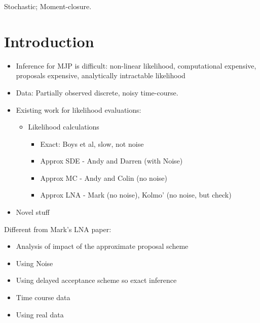\documentclass[useAMS,usenatbib,referee]{example/biom}
\begin{document}
%
%

\begin{keywords}
Stochastic; Moment-closure.
\end{keywords}

\maketitle

\section{Introduction}
\label{s:intro}

\begin{itemize}
\item Inference for MJP is difficult: non-linear likelihood, computational
  expensive, proposals expensive, analytically intractable likelihood
\item Data: Partially observed discrete, noisy time-course.
\item Existing work for likelihood evaluations: 
\begin{itemize}
\item Likelihood calculations
\begin{itemize}
\item Exact: Boys et al, slow, not noise
\item Approx SDE - Andy and Darren (with Noise)
\item Approx MC - Andy and Colin (no noise)
\item Approx LNA - Mark (no noise), Kolmo' (no noise, but check)
\end{itemize}
\end{itemize}
\item Novel stuff
\end{itemize}
Different from Mark's LNA paper:
\begin{itemize}
\item Analysis of impact of the approximate proposal scheme
\item Using Noise
\item Using delayed acceptance scheme so exact inference
\item Time course data
\item Using real data
\end{itemize}
\end{document}
